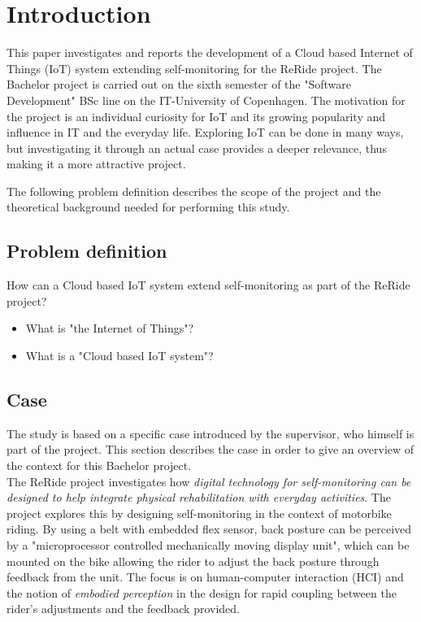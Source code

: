 \section{Introduction}
This paper investigates and reports the development of a Cloud based Internet of Things (IoT) system extending self-monitoring for the ReRide project. The Bachelor project is carried out on the sixth semester of the "Software Development" BSc line on the IT-University of Copenhagen. The motivation for the project is an individual curiosity for IoT and its growing popularity and influence in IT and the everyday life. Exploring IoT can be done in many ways, but investigating it through an actual case provides a deeper relevance, thus making it a more attractive project. 

The following problem definition describes the scope of the project and the theoretical background needed for performing this study.

\subsection{Problem definition}
How can a Cloud based IoT system extend self-monitoring as part of the ReRide project?
\begin{itemize}
	\item What is "the Internet of Things"?
	\item What is a "Cloud based IoT system"?
\end{itemize}

\subsection{Case}
The study is based on a specific case introduced by the supervisor, who himself is part of the project. This section describes the case in order to give an overview of the context for this Bachelor project. \\

The ReRide project\cite{article:reride} investigates how \textit{digital technology for self-monitoring can be designed to help integrate physical rehabilitation with everyday activities}. The project explores this by designing self-monitoring in the context of motorbike riding. By using a belt with embedded flex sensor, back posture can be perceived by a "microprocessor controlled mechanically moving display unit", which can be mounted on the bike allowing the rider to adjust the back posture through feedback from the unit. The focus is on human-computer interaction (HCI) and the notion of \textit{embodied perception} in the design for rapid coupling between the rider's adjustments and the feedback provided.  \\

